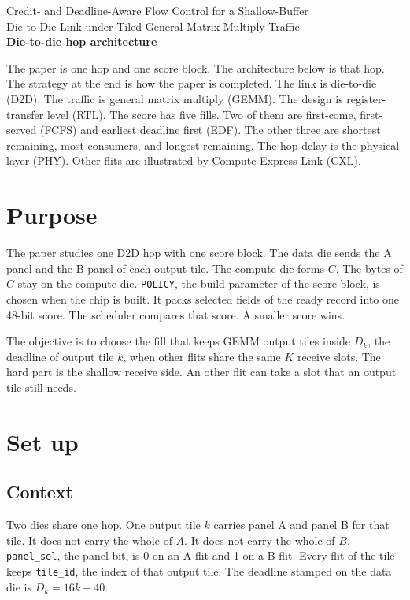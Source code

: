 \documentclass[11pt,a4paper]{article}
\begin{document}
\begin{center}
{\large Credit- and Deadline-Aware Flow Control for a Shallow-Buffer\\
Die-to-Die Link under Tiled General Matrix Multiply Traffic}\\[0.8em]
{\Large\bfseries Die-to-die hop architecture}\\[0.5em]
\end{center}

The paper is one hop and one score block.
The architecture below is that hop.
The strategy at the end is how the paper is completed.
The link is die-to-die (D2D).
The traffic is general matrix multiply (GEMM).
The design is register-transfer level (RTL).
The score has five fills.
Two of them are first-come, first-served (FCFS) and earliest deadline first (EDF).
The other three are shortest remaining, most consumers, and longest remaining.
The hop delay is the physical layer (PHY).
Other flits are illustrated by Compute Express Link (CXL).

\section{Purpose}
The paper studies one D2D hop with one score block.
The data die sends the A panel and the B panel of each output tile.
The compute die forms $C$.
The bytes of $C$ stay on the compute die.
\texttt{POLICY}, the build parameter of the score block, is chosen when the chip is built.
It packs selected fields of the ready record into one 48-bit score.
The scheduler compares that score.
A smaller score wins.

The objective is to choose the fill that keeps GEMM output tiles inside $D_k$, the deadline of output tile $k$, when other flits share the same $K$ receive slots.
The hard part is the shallow receive side.
An other flit can take a slot that an output tile still needs.

\section{Set up}
\subsection{Context}
Two dies share one hop.
One output tile $k$ carries panel A and panel B for that tile.
It does not carry the whole of $A$.
It does not carry the whole of $B$.
\texttt{panel\_sel}, the panel bit, is 0 on an A flit and 1 on a B flit.
Every flit of the tile keeps \texttt{tile\_id}, the index of that output tile.
The deadline stamped on the data die is $D_k = 16k + 40$.
\end{document}
